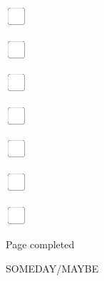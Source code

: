 \documentclass[11pt,titlepage]{article}
\begin{document}
\vspace{10mm}

\noindent
\includegraphics[]{checkbox-4mm.pdf}

\vspace{10mm}

\noindent
\includegraphics[]{checkbox-4mm.pdf}

\vspace{10mm}

\noindent
\includegraphics[]{checkbox-4mm.pdf}

\vspace{10mm}

\noindent
\includegraphics[]{checkbox-4mm.pdf}

\vspace{10mm}

\noindent
\includegraphics[]{checkbox-4mm.pdf}

\vspace{10mm}

\noindent
\includegraphics[]{checkbox-4mm.pdf}

\vspace{10mm}

\noindent
\includegraphics[]{checkbox-4mm.pdf}

\vspace{4mm}

\hfill Page completed \hspace{20mm}

\pagebreak

\small %
\hfill SOMEDAY/MAYBE
\end{document}
